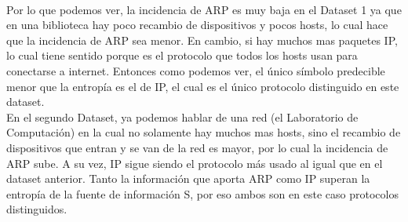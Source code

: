 
 \\


Por lo que podemos ver, la incidencia de ARP es muy baja en el Dataset 1 ya que en una biblioteca hay poco recambio de dispositivos y pocos hosts, lo cual hace que la incidencia de ARP sea menor. En cambio, si hay muchos mas paquetes IP, lo cual tiene sentido porque es el protocolo que todos los hosts usan para conectarse a internet. Entonces como podemos ver, el único símbolo predecible menor que la entropía es el de IP, el cual es el único protocolo distinguido en este dataset. \\

En el segundo Dataset, ya podemos hablar de una red (el Laboratorio de Computación) en la cual no solamente hay muchos mas hosts, sino el recambio de dispositivos que entran y se van de la red es mayor, por lo cual la incidencia de ARP sube. A su vez, IP sigue siendo el protocolo más usado al igual que en el dataset anterior. Tanto la información que aporta ARP como IP superan la entropía de la fuente de información S, por eso ambos son en este caso protocolos distinguidos. \\

